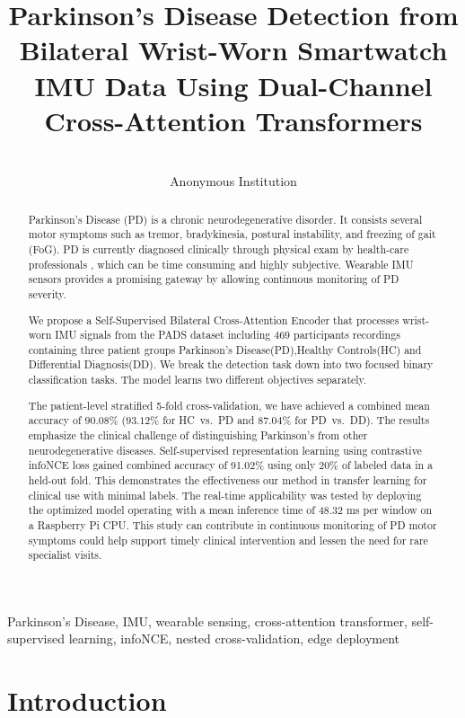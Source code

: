 \documentclass[pmlr]{jmlr}
\title[PD Detection from Bilateral IMU via Cross-Attention Transformers]{%
  Parkinson's Disease Detection from Bilateral Wrist-Worn Smartwatch
  IMU Data Using Dual-Channel Cross-Attention Transformers}
\author{%
  \Name{Anonymous Author(s)} \Email{anonymous@institution.edu}\\
  \addr Anonymous Institution
}
\begin{document}
\raggedbottom
\maketitle

\begin{abstract}
Parkinson's Disease (PD) is a chronic neurodegenerative disorder. It consists several motor symptoms such as tremor, bradykinesia, postural instability, and freezing of gait (FoG). PD is currently diagnosed clinically through physical exam by health-care professionals , which can be time consuming and highly subjective. Wearable IMU sensors provides a promising gateway by allowing continuous monitoring of PD severity. 

We propose a Self-Supervised Bilateral Cross-Attention Encoder that processes wrist-worn IMU signals from the PADS dataset including 469 participants recordings containing three patient groups Parkinson's Disease(PD),Healthy Controls(HC) and Differential Diagnosis(DD). We break the detection task down into two focused binary classification tasks. The model learns two different objectives separately. 

The patient-level stratified 5-fold cross-validation, we have achieved a combined mean accuracy of $90.08$\% ($93.12$\% for HC~vs.~PD and $87.04$\% for PD~vs.~DD). The results emphasize the clinical challenge of distinguishing Parkinson's from other neurodegenerative diseases. Self-supervised representation learning using contrastive infoNCE loss gained  combined accuracy of 91.02\% using only 20\% of labeled data in a held-out fold. This demonstrates the effectiveness our method in transfer learning for clinical use with minimal labels.  The real-time applicability was tested by deploying the optimized model operating with a mean inference time of 48.32 ms per window on a Raspberry Pi CPU. This study can contribute in continuous monitoring of PD motor symptoms could help support timely clinical intervention and lessen the need for rare specialist visits.
\end{abstract}

\begin{keywords}
Parkinson's Disease, IMU, wearable sensing, cross-attention transformer,
self-supervised learning, infoNCE, nested cross-validation, edge deployment
\end{keywords}


\section{Introduction}
\label{sec:intro}
\end{document}
